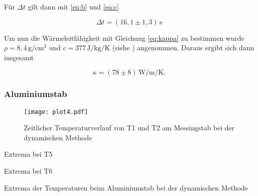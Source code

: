\noindent Für $\Delta t$ gilt dann mit \ref{eq:b} und \ref{eq:c}

\begin{equation*}
  \Delta t=(16,1\pm1,3)\,\si{\second}
\end{equation*}

\noindent Um nun die Wärmeleitfähigkeit mit Gleichung \ref{eq:kappa} zu bestimmen wurde $\rho=8,4\,\si{\gram\per\centi\meter\tothe{3}}$ und $c=377\,\si{\joule\per\kilo\gram\per\kelvin}$ (siehe \cite{chemieMessing}) angenommen.
Daraus ergibt sich dann insgesamt

\begin{equation*}
  \kappa=(78\pm8)\,\si{\watt\per\meter\per\kelvin}.
\end{equation*}

\subsubsection{Aluminiumstab}

\begin{figure}[H]
  \centering
  \texttt{[image: plot4.pdf]}
  \caption{Zeitlicher Temperaturverlauf von T1 und T2 am Messingstab bei der dynamischen Methode}
  \label{fig:f}
\end{figure}


  \begin{table}[H]
  \centering
    \begin{subtable}{.42\linewidth}
      \centering
            \caption{Extrema bei T5}

    \end{subtable}
    \begin{subtable}{.42\linewidth}
      \centering
           \caption{Extrema bei T6}

    \end{subtable} 
        \caption{Extrema der Temperaturen beim Aluminiumstab bei der dynamischen Methode}
    \label{tab:c}
\end{table}

